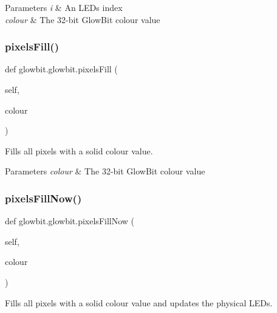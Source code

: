 \begin{DoxyParams}{Parameters}
{\em i} & An L\+ED\textquotesingle{}s index \\
\hline
{\em colour} & The 32-\/bit Glow\+Bit colour value \\
\hline
\end{DoxyParams}
\mbox{\label{classglowbit_1_1glowbit_aca86823fecc4949692ac18f8c21e34ac}} 
\subsubsection{\texorpdfstring{pixels\+Fill()}{pixelsFill()}}
{\footnotesize\ttfamily def glowbit.\+glowbit.\+pixels\+Fill (\begin{DoxyParamCaption}\item[{}]{self,  }\item[{}]{colour }\end{DoxyParamCaption})}



Fills all pixels with a solid colour value. 


\begin{DoxyParams}{Parameters}
{\em colour} & The 32-\/bit Glow\+Bit colour value \\
\hline
\end{DoxyParams}
\mbox{\label{classglowbit_1_1glowbit_a2aae728fcc6e8cdfe5c745ac0a7d308d}} 
\subsubsection{\texorpdfstring{pixels\+Fill\+Now()}{pixelsFillNow()}}
{\footnotesize\ttfamily def glowbit.\+glowbit.\+pixels\+Fill\+Now (\begin{DoxyParamCaption}\item[{}]{self,  }\item[{}]{colour }\end{DoxyParamCaption})}



Fills all pixels with a solid colour value and updates the physical L\+E\+Ds. 


